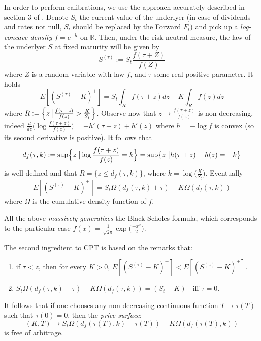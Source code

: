 \documentclass{article}
\providecommand{\tightlist}{%
      \setlength{\itemsep}{0pt}\setlength{\parskip}{0pt}}
\begin{document}
	In order to perform calibrations, we use the approach accurately
described in section 3 of \cite{antonov2019new}. Denote \(S_t\) the
current value of the underlyer (in case of dividends and rates not null,
\(S_t\) should be replaced by the Forward \(F_t\)) and pick up a
\emph{log-concave density} \(f=e^{-h}\) on \(\mathbb R\). Then, under
the risk-neutral measure, the law of the underlyer \(S\) at fixed
maturity will be given by \[S^{(\tau)}:= S_t \frac{f(\tau+Z)}{f(Z)}\]
where \(Z\) is a random variable with law \(f\), and \(\tau\) some real
positive parameter. It holds
\[E[(S^{(\tau)}-K)^+] = S_t \int_R f(\tau+z) dz -K \int_R f(z) dz\]
where
\(R:= \Bigl\{z\;\big| \frac{f(\tau+z)}{f(z)}> \frac{K}{S_t} \Bigr\}\).
Observe now that \(z \to \frac{f(\tau+z)}{f(z)}\) is non-decreasing,
indeed
\(\frac{d}{dz}\bigl(\log{\frac{f(\tau+z)}{f(z)}}\bigr)=-h'(\tau+z)+h'(z)\)
where \(h=-\log{f}\) is convex (so its second derivative is positive).
It follows that
\[d_f(\tau,k):=\sup\Bigl\{ z \; \big| \log{\frac{f(\tau+z)}{f(z)}}=k\Bigr\} = \sup\bigl\{ z \; \big| h(\tau+z)-h(z)=-k\bigr\}\]
is well defined and that \(R=\{z \leq d_f(\tau,k)\}\), where
\(k=\log\bigl(\frac{K}{S_t}\bigr)\). Eventually
\[E[(S^{(\tau)}-K)^+] = S_t\Omega(d_f(\tau,k)+\tau) -K \Omega(d_f(\tau,k))\]
where \(\Omega\) is the cumulative density function of \(f\).

All the above \emph{massively generalizes} the Black-Scholes formula,
which corresponds to the particular case
\(f(x)=\frac{1}{\sqrt{2 \pi}}\exp\bigl(\frac{-x^2}{2}\bigr)\).

The second ingredient to CPT is based on the remarks that:

\begin{enumerate}
\def\labelenumi{\arabic{enumi}.}
\tightlist
\item
  if \(\tau<z\), then for every \(K>0\),
  \(E[(S^{(\tau)}-K)^+]<E[(S^{(z)}-K)^+]\).
\item
  \(S_t \Omega(d_f(\tau,k)+\tau) -K \Omega(d_f(\tau,k))=(S_t-K)^+\) iff
  \(\tau=0\).
\end{enumerate}

It follows that if one chooses any non-decreasing continuous function
\(T \to \tau(T)\) such that \(\tau(0)=0\), then the \emph{price
surface}:
\[(K,T) \to S_t \Omega(d_f(\tau(T),k)+\tau(T)) - K\Omega(d_f(\tau(T),k))\]
is free of arbitrage.
\end{document}
